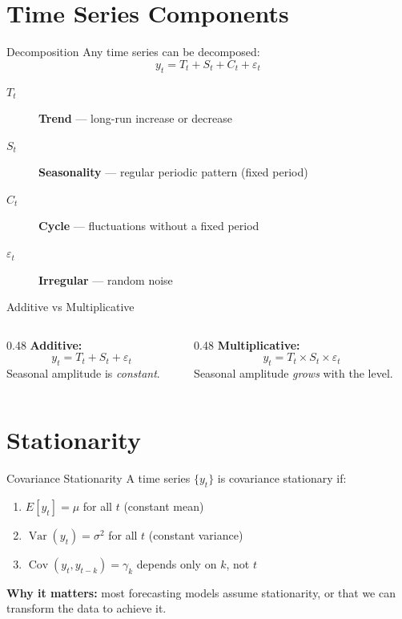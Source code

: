 \documentclass[aspectratio=169, 10pt]{beamer}
\begin{document}
\section{Time Series Components}

\begin{frame}{Decomposition}
Any time series can be decomposed:
\[
y_t = T_t + S_t + C_t + \varepsilon_t
\]
\begin{description}
    \item[$T_t$] \textbf{Trend} --- long-run increase or decrease
    \item[$S_t$] \textbf{Seasonality} --- regular periodic pattern (fixed period)
    \item[$C_t$] \textbf{Cycle} --- fluctuations without a fixed period
    \item[$\varepsilon_t$] \textbf{Irregular} --- random noise
\end{description}
\end{frame}

\begin{frame}{Additive vs Multiplicative}
\begin{columns}[T]
\begin{column}{0.48\textwidth}
\textbf{Additive:}
\[
y_t = T_t + S_t + \varepsilon_t
\]
Seasonal amplitude is \emph{constant}.
\end{column}
\begin{column}{0.48\textwidth}
\textbf{Multiplicative:}
\[
y_t = T_t \times S_t \times \varepsilon_t
\]
Seasonal amplitude \emph{grows} with the level.
\end{column}
\end{columns}
\end{frame}

\section{Stationarity}

\begin{frame}{Covariance Stationarity}
A time series $\{y_t\}$ is \alert{covariance stationary} if:
\begin{enumerate}
    \item $E[y_t] = \mu$ for all $t$ (constant mean)
    \item $\operatorname{Var}(y_t) = \sigma^2$ for all $t$ (constant variance)
    \item $\operatorname{Cov}(y_t, y_{t-k}) = \gamma_k$ depends only on $k$, not $t$
\end{enumerate}

\vspace{0.5em}
\textbf{Why it matters:} most forecasting models assume stationarity, or that we can transform the data to achieve it.
\end{frame}
\end{document}
